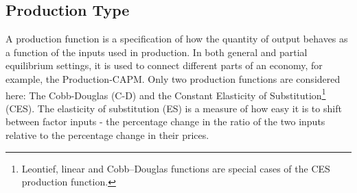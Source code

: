 \documentclass[11pt]{article}
\begin{document}
\subsection{Production Type}
A production function is a specification of how the quantity of output behaves as a function of the inputs used in production.  In both general and partial equilibrium settings, it is used to connect different parts of an economy, for example, the Production-CAPM\autocite{cochrane91}.  Only two production functions are considered here: The Cobb-Douglas (C-D) and the Constant Elasticity of Substitution\footnote{Leontief, linear and Cobb–Douglas functions are special cases of the CES production function.} (CES).  The elasticity of substitution (ES) is a measure of how easy it is to shift between factor inputs - the percentage change in the ratio of the two inputs relative to the percentage change in their prices.
\end{document}
